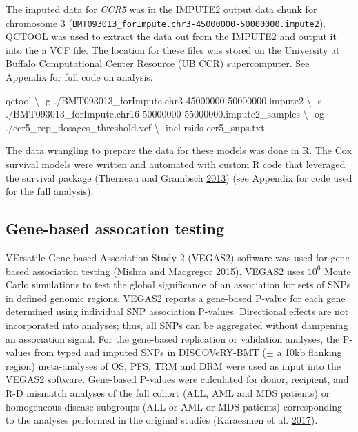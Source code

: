 \documentclass[]{DissertateOSU}
\newenvironment{Shaded}{\begin{snugshade}}{\end{snugshade}}
\newcommand{\DataTypeTok}[1]{\textcolor[rgb]{0.13,0.29,0.53}{#1}}
\newcommand{\ExtensionTok}[1]{#1}
\newcommand{\NormalTok}[1]{#1}
\begin{document}
\noindent The imputed data for \emph{CCR5} was in the IMPUTE2 output
data chunk for chromosome 3
(\texttt{BMT093013\_forImpute.chr3-45000000-50000000.impute2}). QCTOOL
was used to extract the data out from the IMPUTE2 and output it into the
a VCF file. The location for these files was stored on the University at
Buffalo Computational Center Resource (UB CCR) supercomputer. See
Appendix for full code on analysis.

\singlespacing

\begin{Shaded}
\begin{Highlighting}[]
\ExtensionTok{qctool} \DataTypeTok{\textbackslash{} }
    \ExtensionTok{-g}\NormalTok{ ./BMT093013_forImpute.chr3-45000000-50000000.impute2 \textbackslash{}}
\NormalTok{    -s ./BMT093013_forImpute.chr16-50000000-55000000.impute2_samples \textbackslash{}}
\NormalTok{    -og ./ccr5_rep_dosages_threshold.vcf \textbackslash{}}
\NormalTok{    -incl-rsids ccr5_snps.txt }
\end{Highlighting}
\end{Shaded}

\doublespacing
\noindent The data wrangling to prepare the data for these models was
done in R. The Cox survival models were written and automated with
custom R code that leveraged the survival package (Therneau and Grambsch
\protect\hyperlink{ref-therneau2013}{2013}) (see Appendix for code used
for the full analysis).

\subsection{Gene-based assocation
testing}\label{gene-based-assocation-testing}

VErsatile Gene-based Association Study 2 (VEGAS2) software was used for
gene-based association testing (Mishra and Macgregor
\protect\hyperlink{ref-Mishra_2015}{2015}). VEGAS2 uses \(10^{6}\) Monte
Carlo simulations to test the global significance of an association for
sets of SNPs in defined genomic regions. VEGAS2 reports a gene-based
P-value for each gene determined using individual SNP association
P-values. Directional effects are not incorporated into analyses; thus,
all SNPs can be aggregated without dampening an association signal. For
the gene-based replication or validation analyses, the P-values from
typed and imputed SNPs in DISCOVeRY-BMT (\(\pm\) a 10kb flanking region)
meta-analyses of OS, PFS, TRM and DRM were used as input into the VEGAS2
software. Gene-based P-values were calculated for donor, recipient, and
R-D mismatch analyses of the full cohort (ALL, AML and MDS patients) or
homogeneous disease subgroups (ALL or AML or MDS patients) corresponding
to the analyses performed in the original studies (Karaesmen et al.
\protect\hyperlink{ref-Karaesmen_2017}{2017}).
\end{document}
